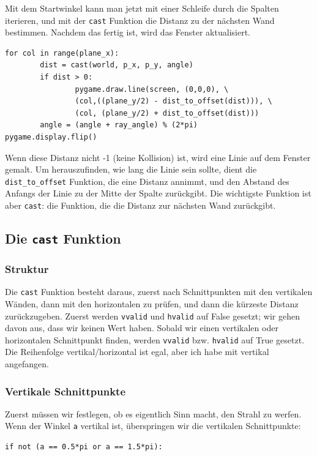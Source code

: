 \documentclass[a4paper,12pt]{report}
\begin{document}
Mit dem Startwinkel kann man jetzt mit einer Schleife durch die Spalten iterieren, und mit der \texttt{cast} Funktion die Distanz zu der n\"achsten Wand bestimmen. Nachdem das fertig ist, wird das Fenster aktualisiert.
\begin{Verbatim}[baselinestretch=1.0, xleftmargin=1cm]
for col in range(plane_x):
        dist = cast(world, p_x, p_y, angle)
        if dist > 0:
                pygame.draw.line(screen, (0,0,0), \
                (col,((plane_y/2) - dist_to_offset(dist))), \
                (col, (plane_y/2) + dist_to_offset(dist)))
        angle = (angle + ray_angle) % (2*pi)
pygame.display.flip()
\end{Verbatim}
Wenn diese Distanz nicht -1 (keine Kollision) ist, wird eine Linie auf dem Fenster gemalt. Um herauszufinden, wie lang die Linie sein sollte, dient die \texttt{dist\_to\_offset} Funktion, die eine Distanz annimmt, und den Abstand des Anfangs der Linie zu der Mitte der Spalte zur\"uckgibt. Die wichtigste Funktion ist aber \texttt{cast}: die Funktion, die die Distanz zur n\"achsten Wand zur\"uckgibt.

\subsection{Die \texttt{cast} Funktion}
\subsubsection{Struktur}
Die \texttt{cast} Funktion besteht daraus, zuerst nach Schnittpunkten mit den vertikalen W\"anden, dann mit den horizontalen zu pr\"ufen, und dann die k\"urzeste Distanz zur\"uckzugeben. Zuerst werden \texttt{vvalid} und \texttt{hvalid} auf False gesetzt; wir gehen davon aus, dass wir keinen Wert haben. Sobald wir einen vertikalen oder horizontalen Schnittpunkt finden, werden \texttt{vvalid} bzw. \texttt{hvalid} auf True gesetzt. \\
Die Reihenfolge vertikal/horizontal ist egal, aber ich habe mit vertikal angefangen.
\subsubsection{Vertikale Schnittpunkte}
Zuerst m\"ussen wir festlegen, ob es eigentlich Sinn macht, den Strahl zu werfen. Wenn der Winkel \texttt{a} vertikal ist, \"uberspringen wir die vertikalen Schnittpunkte:
\begin{Verbatim}[baselinestretch=1.0, xleftmargin=1cm]
if not (a == 0.5*pi or a == 1.5*pi):
\end{Verbatim}
\end{document}
